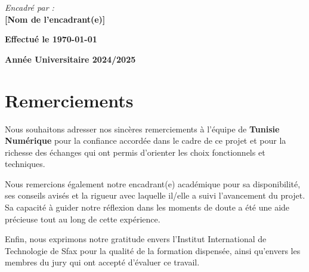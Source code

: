 \documentclass[12pt,a4paper]{report}
\begin{document}
\begin{titlepage}
\begin{center}
    \vspace{1.5cm}

    {\normalsize\itshape Encadré par :}\\[0.3cm]
    {\normalsize\bfseries [Nom de l'encadrant(e)]}

    \vfill


    \vspace{0.8cm}
    {\bfseries Effectué le \today}

    \vspace{0.5cm}
    {\bfseries Année Universitaire 2024/2025}
  \end{center}
\end{titlepage}

\setcounter{page}{1}

\chapter*{Remerciements}

Nous souhaitons adresser nos sincères remerciements à l'équipe de \textbf{Tunisie Numérique}
pour la confiance accordée dans le cadre de ce projet et pour la richesse des échanges qui ont
permis d'orienter les choix fonctionnels et techniques.

Nous remercions également notre encadrant(e) académique pour sa disponibilité, ses
conseils avisés et la rigueur avec laquelle il/elle a suivi l'avancement du projet. Sa capacité à
guider notre réflexion dans les moments de doute a été une aide précieuse tout au long de cette
expérience.

Enfin, nous exprimons notre gratitude envers l'Institut International de Technologie
de Sfax pour la qualité de la formation dispensée, ainsi qu'envers les membres du jury qui ont
accepté d'évaluer ce travail.

\end{document}
